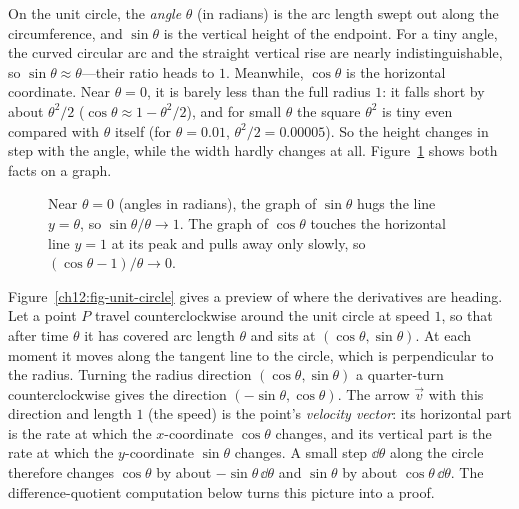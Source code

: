 \begin{intuitionbox}
On the unit circle, the \emph{angle} $\theta$ (in radians) is the arc length
swept out along the circumference, and $\sin\theta$ is the vertical height of
the endpoint. For a tiny angle, the curved circular arc and the straight vertical
rise are nearly indistinguishable, so $\sin\theta \approx \theta$---their ratio
heads to $1$. Meanwhile, $\cos\theta$ is the horizontal coordinate. Near $\theta=0$,
it is barely less than the full radius $1$: it falls short by about
$\theta^2/2$ ($\cos\theta \approx 1 - \theta^2/2$), and for small $\theta$ the
square $\theta^2$ is tiny even compared with $\theta$ itself (for
$\theta = 0.01$, $\theta^2/2 = 0.00005$). So the height changes in step with
the angle, while the width hardly changes at all.
Figure~\ref{ch12:fig-small-angle} shows both facts on a graph.
\end{intuitionbox}

\begin{figure}[htbp]
\centering
{}
\caption{Near $\theta=0$ (angles in radians), the graph of $\sin\theta$ hugs
the line $y=\theta$, so $\sin\theta/\theta \to 1$. The graph of $\cos\theta$
touches the horizontal line $y=1$ at its peak and pulls away only slowly, so
$(\cos\theta-1)/\theta \to 0$.}
\label{ch12:fig-small-angle}
\end{figure}

Figure~\ref{ch12:fig-unit-circle} gives a preview of where the derivatives are
heading. Let a point $P$ travel counterclockwise around the unit circle at
speed $1$, so that after time $\theta$ it has covered arc length $\theta$ and
sits at $(\cos\theta,\sin\theta)$. At each moment it moves along the tangent
line to the circle, which is perpendicular to the radius. Turning the radius
direction $(\cos\theta,\sin\theta)$ a quarter-turn counterclockwise gives the
direction $(-\sin\theta,\cos\theta)$. The arrow $\vec v$ with this direction
and length $1$ (the speed) is the point's \emph{velocity vector}: its
horizontal part is the rate at which the $x$-coordinate $\cos\theta$ changes,
and its vertical part is the rate at which the $y$-coordinate $\sin\theta$
changes. A small step $\dd\theta$ along the circle therefore changes
$\cos\theta$ by about $-\sin\theta\,\dd\theta$ and $\sin\theta$ by about
$\cos\theta\,\dd\theta$. The difference-quotient computation below turns this
picture into a proof.

